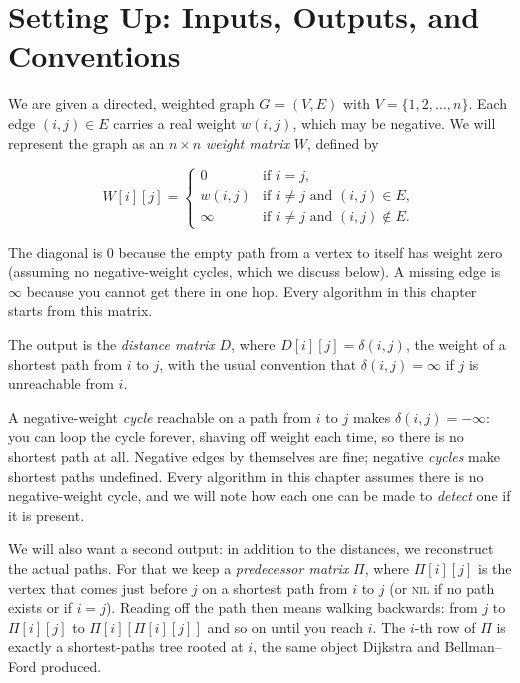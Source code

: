\section{Setting Up: Inputs, Outputs, and Conventions}
\label{ch25:setup}

We are given a
directed, weighted graph $G = (V, E)$ with $V = \{1, 2, \dots, n\}$. Each edge
$(i,j) \in E$ carries a real weight $w(i,j)$, which may be negative. We will
represent the graph as an $n \times n$ \emph{weight matrix} $W$, defined by

\[
W[i][j] =
\begin{cases}
0 & \text{if } i = j,\\[2pt]
w(i,j) & \text{if } i \neq j \text{ and } (i,j) \in E,\\[2pt]
\infty & \text{if } i \neq j \text{ and } (i,j) \notin E.
\end{cases}
\]

The diagonal is $0$ because the empty path from a vertex to itself has weight
zero (assuming no negative-weight cycles, which we discuss below). A missing
edge is $\infty$ because you cannot get there in one hop. Every algorithm in
this chapter starts from this matrix.

The output is the \emph{distance matrix} $D$, where $D[i][j] = \delta(i,j)$,
the weight of a shortest path from $i$ to $j$, with the usual convention that
$\delta(i,j) = \infty$ if $j$ is unreachable from $i$.

\begin{trapbox}
A negative-weight \emph{cycle} reachable on a path from $i$ to $j$ makes
$\delta(i,j) = -\infty$: you can loop the cycle forever, shaving off weight
each time, so there is no shortest path at all. Negative edges by themselves
are fine; negative \emph{cycles} make shortest paths undefined. Every algorithm in this
chapter assumes there is no negative-weight cycle, and we will note how each
one can be made to \emph{detect} one if it is present.
\end{trapbox}

We will also want a second output: in addition to the distances, we reconstruct the actual
paths. For that we keep a \emph{predecessor matrix} $\Pi$, where $\Pi[i][j]$ is
the vertex that comes just before $j$ on a shortest path from $i$ to $j$ (or
\textsc{nil} if no path exists or if $i = j$). Reading off the path then means
walking backwards: from $j$ to $\Pi[i][j]$ to $\Pi[i][\Pi[i][j]]$ and so on
until you reach $i$. The $i$-th row of $\Pi$ is exactly a shortest-paths tree
rooted at $i$, the same object Dijkstra and Bellman--Ford produced.

